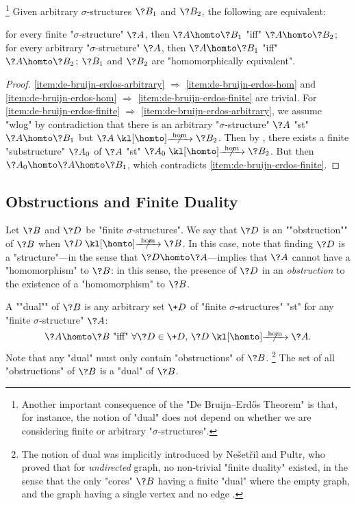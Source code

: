\begin{corollary}
	\!\footnote{Another important consequence of the "De Bruijn–Erdős Theorem" is that,
	for instance, the notion of "dual" does not depend on whether we are considering finite or
	arbitrary "$\sigma$-structures".}
	\AP\label{coro:de-bruijn-erdos}
	Given arbitrary $\sigma$-structures $\?B_1$ and $\?B_2$, the following are equivalent:
	\begin{enumerate}
		\itemAP\label{item:de-bruijn-erdos-finite} for every finite "$\sigma$-structure" $\?A$, then $\?A \homto \?B_1$
		"iff" $\?A \homto \?B_2$;
		\itemAP\label{item:de-bruijn-erdos-arbitrary} for every arbitrary "$\sigma$-structure" $\?A$, then $\?A \homto \?B_1$
			"iff" $\?A \homto \?B_2$;
		\itemAP\label{item:de-bruijn-erdos-hom} $\?B_1$ and $\?B_2$ are "homomorphically equivalent".
	\end{enumerate}
\end{corollary}
\begin{proof}
	\eqref{item:de-bruijn-erdos-arbitrary} $\Rightarrow$ \eqref{item:de-bruijn-erdos-hom}
	and \eqref{item:de-bruijn-erdos-hom} $\Rightarrow$ \eqref{item:de-bruijn-erdos-finite}
	are trivial.
	For \eqref{item:de-bruijn-erdos-finite} $\Rightarrow$ \eqref{item:de-bruijn-erdos-arbitrary},
	we assume "wlog" by contradiction that there is an arbitrary "$\sigma$-structure" $\?A$ "st" $\?A \homto \?B_1$ but $\?A \nothomto \?B_2$. Then by ,
	there exists a finite "substructure" $\?A_0$ of $\?A$ "st" $\?A_0 \nothomto \?B_2$.
	But then $\?A_0 \homto \?A \homto \?B_1$, which contradicts \eqref{item:de-bruijn-erdos-finite}.
\end{proof}


\subsection{Obstructions and Finite Duality}

Let $\?B$ and $\?D$ be "finite $\sigma$-structures".
We say that $\?D$ is an \AP""obstruction"" of $\?B$ when $\?D \nothomto \?B$.
In this case, note that finding $\?D$ is a "structure"---in the sense that $\?D \homto \?A$---implies that $\?A$ cannot have a "homomorphism" to $\?B$: in this sense, the presence of
$\?D$ in an \emph{obstruction} to the existence of a "homomorphism" to $\?B$.

A \AP""dual"" of $\?B$ is any arbitrary set $\+D$ of "finite $\sigma$-structures" "st"
for any "finite $\sigma$-structure" $\?A$:
\[
	\?A \homto \?B
	\text{ "iff" }
	\forall \?D \in \+D,\, \?D \nothomto \?A.
\]
Note that any "dual" must only contain "obstructions" of $\?B$.%
\footnote{The notion of dual was implicitly introduced
by Ne\v{s}et\v{r}il and Pultr, who proved that for \emph{undirected} graph, no
non-trivial "finite duality" existed, in the sense that the
only "cores" $\?B$ having a finite "dual" where the empty graph, and the graph having
a single vertex and no edge \cite[Corollary 4.1]{NesetrilPultr1978Duality}.}
The set of all "obstructions" of $\?B$ is a "dual" of $\?B$.

